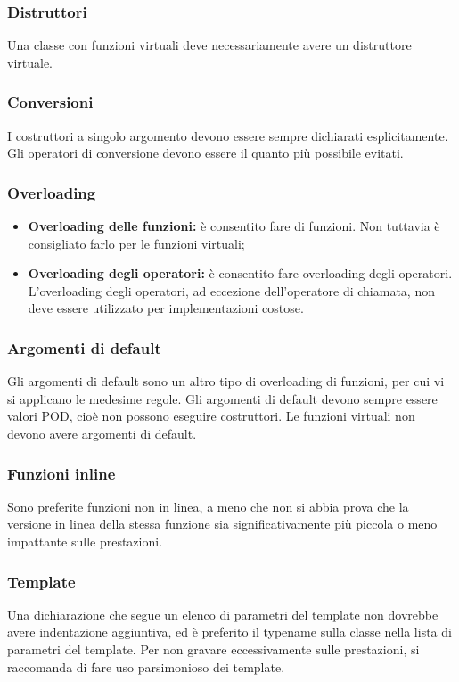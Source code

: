 \documentclass[../NomeDocumento.tex]{subfiles}
\begin{document}
	\subsubsection{Distruttori}
	Una classe con funzioni virtuali deve necessariamente avere un distruttore virtuale.
		
	\subsubsection{Conversioni} 
	I costruttori a singolo argomento devono essere sempre dichiarati esplicitamente.	Gli operatori di conversione devono essere il quanto più possibile evitati.
	
	\subsubsection{Overloading}
	\begin{itemize}
		\item \textbf{Overloading delle funzioni:} è consentito fare  di funzioni. Non tuttavia è consigliato farlo per le funzioni virtuali;
		
		\item \textbf{Overloading degli operatori:} è consentito fare overloading degli operatori. L'overloading degli operatori, ad eccezione dell'operatore di chiamata, non deve essere utilizzato per implementazioni costose.
	\end{itemize}

	\subsubsection{Argomenti di default} 
	Gli argomenti di default sono un altro tipo di overloading di funzioni, per cui vi si applicano le medesime regole. Gli argomenti di default devono sempre essere valori POD, cioè non possono eseguire costruttori. Le funzioni virtuali non devono avere argomenti di default.
		
	\subsubsection{Funzioni inline}
	 Sono preferite funzioni non in linea, a meno che non si abbia prova che la versione in linea della stessa funzione sia significativamente più piccola o meno impattante sulle prestazioni.
	
	\subsubsection{Template} 
	Una dichiarazione che segue un elenco di parametri del template non dovrebbe avere indentazione aggiuntiva, ed è preferito il typename sulla classe nella lista di parametri del template. Per non gravare eccessivamente sulle prestazioni, si raccomanda di fare uso parsimonioso dei template.
	
\end{document}
